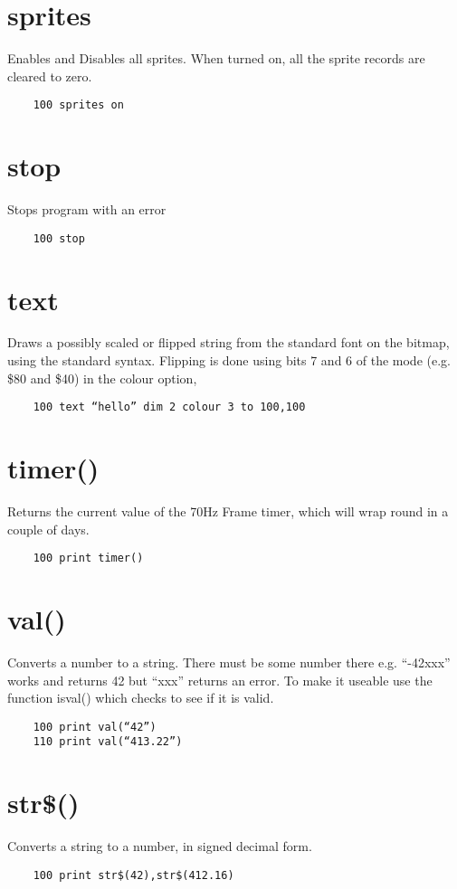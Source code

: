 \section*{sprites}
Enables and Disables all sprites. When turned on, all the sprite records are cleared to zero.
\example{}
\begin{verbatim}
	100 sprites on
\end{verbatim}

\section*{stop}
Stops program with an error
\example{}
\begin{verbatim}
	100 stop
\end{verbatim}

\section*{text}
Draws a possibly scaled or flipped string from the standard font on the bitmap, using the standard syntax. Flipping is done using bits 7 and 6 of the mode (e.g. \$80 and \$40) in the colour option, 
\example{}
\begin{verbatim}
	100 text “hello” dim 2 colour 3 to 100,100
\end{verbatim}

\section*{timer()}
Returns the current value of the 70Hz Frame timer, which will wrap round in a couple of days.
\example{}
\begin{verbatim}
	100 print timer()
\end{verbatim}

\section*{val()}
Converts a number to a string. There must be some number there e.g. “-42xxx” works and returns 42 but “xxx” returns an error.  To make it useable use the function isval() which checks to see if it is valid.
\example{}
\begin{verbatim}
	100 print val(“42”)
	110 print val(“413.22”)
\end{verbatim}

\section*{str\$()}
Converts a string to a number, in signed decimal form. 
\example{}
\begin{verbatim}
	100 print str$(42),str$(412.16)
\end{verbatim}

